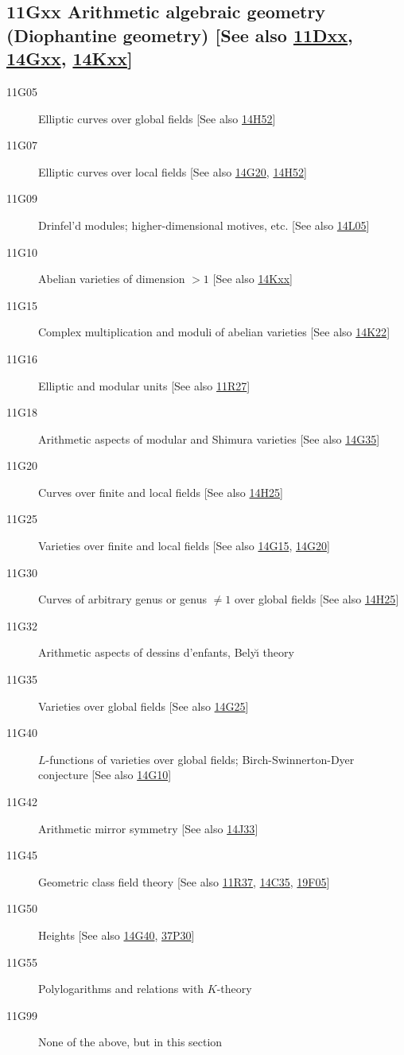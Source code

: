 \subsection*{11Gxx  Arithmetic algebraic geometry (Diophantine geometry) [See also \hyperref[11Dxx]{11Dxx}, \hyperref[14Gxx]{14Gxx}, \hyperref[14Kxx]{14Kxx}] }\label{11Gxx}
\begin{description}  
\item [11G05]\label{11G05} Elliptic curves over global fields [See also \hyperref[14H52]{14H52}]
\item [11G07]\label{11G07} Elliptic curves over local fields [See also \hyperref[14G20]{14G20}, \hyperref[14H52]{14H52}]
\item [11G09]\label{11G09} Drinfel'd modules; higher-dimensional motives, etc. [See also \hyperref[14L05]{14L05}]
\item [11G10]\label{11G10} Abelian varieties of dimension $> 1$ [See also \hyperref[14Kxx]{14Kxx}]
\item [11G15]\label{11G15} Complex multiplication and moduli of abelian varieties [See also \hyperref[14K22]{14K22}]
\item [11G16]\label{11G16} Elliptic and modular units [See also \hyperref[11R27]{11R27}]
\item [11G18]\label{11G18} Arithmetic aspects of modular and Shimura varieties [See also \hyperref[14G35]{14G35}]
\item [11G20]\label{11G20} Curves over finite and local fields [See also \hyperref[14H25]{14H25}]
\item [11G25]\label{11G25} Varieties over finite and local fields [See also \hyperref[14G15]{14G15}, \hyperref[14G20]{14G20}]
\item [11G30]\label{11G30} Curves of arbitrary genus or genus $\ne 1$ over global fields [See also \hyperref[14H25]{14H25}]
\item [11G32]\label{11G32} Arithmetic aspects of dessins d'enfants, Bely\u{\i} theory
\item [11G35]\label{11G35} Varieties over global fields [See also \hyperref[14G25]{14G25}]
\item [11G40]\label{11G40} $L$-functions of varieties over global fields; Birch-Swinnerton-Dyer conjecture [See also \hyperref[14G10]{14G10}]
\item [11G42]\label{11G42} Arithmetic mirror symmetry [See also \hyperref[14J33]{14J33}]
\item [11G45]\label{11G45} Geometric class field theory [See also \hyperref[11R37]{11R37}, \hyperref[14C35]{14C35}, \hyperref[19F05]{19F05}]
\item [11G50]\label{11G50} Heights [See also \hyperref[14G40]{14G40}, \hyperref[37P30]{37P30}]
\item [11G55]\label{11G55} Polylogarithms and relations with $K$-theory
\item [11G99]\label{11G99} None of the above, but in this section
\end{description}
